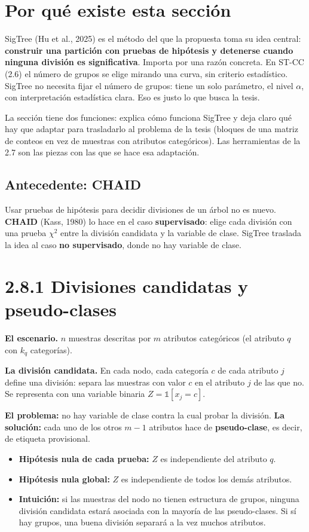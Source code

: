 \documentclass[11pt,a4paper]{article}
\begin{document}
\section{Por qué existe esta sección}

SigTree (Hu et al., 2025) es el método del que la propuesta toma su idea central:
\textbf{construir una partición con pruebas de hipótesis y detenerse cuando ninguna
división es significativa}. Importa por una razón concreta. En ST-CC (2.6) el
número de grupos se elige mirando una curva, sin criterio estadístico. SigTree no
necesita fijar el número de grupos: tiene un solo parámetro, el nivel $\alpha$, con
interpretación estadística clara. Eso es justo lo que busca la tesis.

La sección tiene dos funciones: explica cómo funciona SigTree y deja claro qué hay
que adaptar para trasladarlo al problema de la tesis (bloques de una matriz de
conteos en vez de muestras con atributos categóricos). Las herramientas de la 2.7
son las piezas con las que se hace esa adaptación.

\subsection{Antecedente: CHAID}

Usar pruebas de hipótesis para decidir divisiones de un árbol no es nuevo.
\textbf{CHAID} (Kass, 1980) lo hace en el caso \textbf{supervisado}: elige cada
división con una prueba $\chi^2$ entre la división candidata y la variable de
clase. SigTree traslada la idea al caso \textbf{no supervisado}, donde no hay
variable de clase.

\section{2.8.1 Divisiones candidatas y pseudo-clases}

\textbf{El escenario.} $n$ muestras descritas por $m$ atributos categóricos (el
atributo $q$ con $k_q$ categorías).

\textbf{La división candidata.} En cada nodo, cada categoría $c$ de cada atributo
$j$ define una división: separa las muestras con valor $c$ en el atributo $j$ de las
que no. Se representa con una variable binaria $Z=\mathbb 1[x_j=c]$.

\textbf{El problema:} no hay variable de clase contra la cual probar la división.
\textbf{La solución:} cada uno de los otros $m-1$ atributos hace de
\textbf{pseudo-clase}, es decir, de etiqueta provisional.
\begin{itemize}
  \item \textbf{Hipótesis nula de cada prueba:} $Z$ es independiente del atributo
  $q$.
  \item \textbf{Hipótesis nula global:} $Z$ es independiente de todos los demás
  atributos.
  \item \textbf{Intuición:} si las muestras del nodo no tienen estructura de
  grupos, ninguna división candidata estará asociada con la mayoría de las
  pseudo-clases. Si sí hay grupos, una buena división separará a la vez muchos
  atributos.
\end{itemize}
\end{document}
